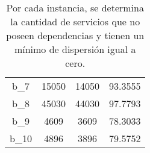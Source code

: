 \begin{table}[]
\begin{tabular}{@{}cccc@{}}
		b\_7         & 15050                    & 14050                                             & 93.3555  \\
		b\_8         & 45030                    & 44030                                             & 97.7793  \\
		b\_9         & 4609                     & 3609                                              & 78.3033  \\
		b\_10        & 4896                     & 3896                                              & 79.5752  \\ \bottomrule
	\end{tabular}
	\caption{\small Por cada instancia, se determina la cantidad de servicios que no poseen dependencias y tienen un mínimo de dispersión igual a cero.}
	\label{tabla:analisis-servicios}
\end{table}